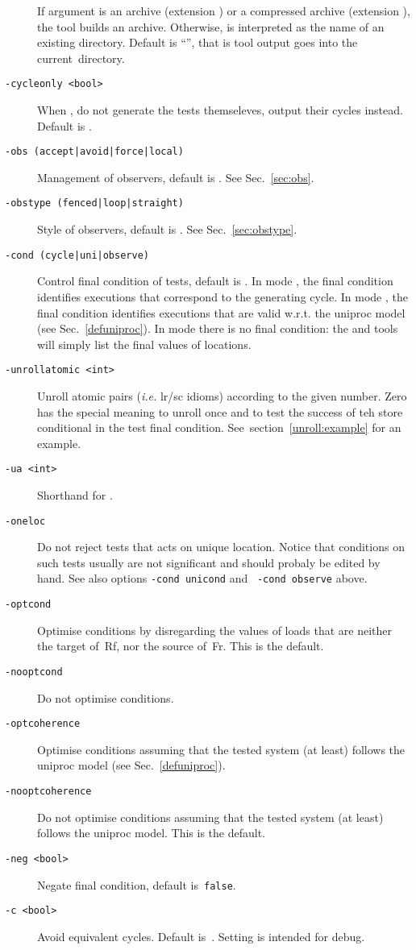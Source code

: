 \begin{description}
If  argument  is an archive (extension )
or a compressed archive (extension ),
the tool builds an archive.
Otherwise,  is interpreted as the name of an
existing directory.
Default is ``'', that is tool output goes into the
current~directory.
\item[{\tt -cycleonly <bool>}] When , do not generate the tests themseleves, output their cycles instead. Default is .
\item[{\tt -obs (accept|avoid|force|local)}] Management of observers,
default is . See Sec.~\ref{sec:obs}.
\item[{\tt -obstype (fenced|loop|straight)}]
Style of observers, default is . See Sec.~\ref{sec:obstype}.
\item[{\tt -cond (cycle|uni|observe)}]
Control final condition of tests, default is .
In mode , the final condition identifies executions
that correspond to the generating cycle.
In mode , the final condition identifies executions
that are valid w.r.t. the uniproc model (see Sec.~\ref{defuniproc}).
In mode   there is no final condition:
the \litmus{} and \herd{} tools will simply list the final
values of locations.
\item[{\tt -unrollatomic <int>}] Unroll atomic pairs (\emph{i.e.} lr/sc idioms)
according to the given number. Zero has the special meaning to unroll once and
to test the success of teh store conditional in the test final condition. See~section~\ref{unroll:example} for an example.
\item[{\tt -ua <int>}] Shorthand for .
\item[{\tt -oneloc}] Do not reject tests that acts on unique location.
Notice that conditions on such tests usually are not significant
and should probaly be edited by hand. See also options
\texttt{-cond unicond} and~ \texttt{-cond observe} above.
\item [{\tt -optcond}] Optimise conditions by disregarding the values
of loads that are neither the target of~Rf, nor the source of~Fr. This is
the default.
\item [{\tt -nooptcond}] Do not optimise conditions.
\item [{\tt -optcoherence}] Optimise conditions assuming that
the tested system (at least) follows the uniproc model
(see Sec.~\ref{defuniproc}).
\item [{\tt -nooptcoherence}] Do not optimise conditions assuming that
the tested system (at least) follows the uniproc model. This is the default.
\item [{\tt -neg <bool>}] Negate final condition, default is~\texttt{false}.
\item[{\tt -c <bool>}] Avoid equivalent cycles. Default is~.
Setting  is intended for debug.
\end{description}

